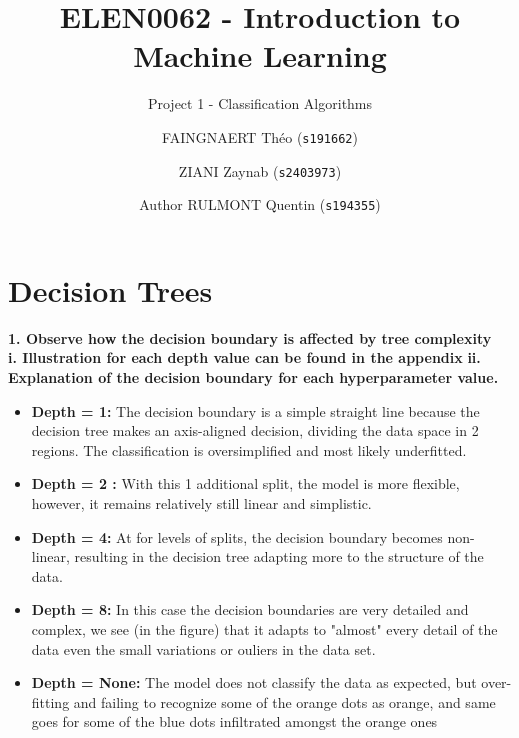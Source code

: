 \documentclass[acmconf,nonacm=true]{acmart}
\begin{document}
\title{ELEN0062 - Introduction to Machine Learning}
\subtitle{Project 1 - Classification Algorithms}

\author{FAINGNAERT Théo (\texttt{s191662})}
\author{ZIANI Zaynab (\texttt{s2403973})}
\author{Author RULMONT Quentin (\texttt{s194355})}

\maketitle

\section{Decision Trees}


\textbf{1. Observe how the decision boundary is affected by tree complexity}\\
\textbf{i. Illustration for each depth value can be found in the appendix}
\newline
    \textbf{ii. Explanation of the decision boundary for each hyperparameter value.}
    \begin{itemize}
        \item \textbf{Depth = 1: }The decision boundary is a simple straight line because the decision tree makes an axis-aligned decision, dividing the data space in 2 regions. The classification is oversimplified and most likely underfitted.
    \end{itemize}
    \begin{itemize}
        \item \textbf{Depth = 2 :}  With this 1 additional split, the model is more flexible, however, it remains relatively still linear and simplistic.
    \end{itemize}
   \begin{itemize}
       \item \textbf{ Depth = 4: }At for levels of splits, the decision boundary becomes non-linear, resulting in the decision tree adapting more to the structure of the data.
   \end{itemize}
   \begin{itemize}
       \item \textbf{Depth = 8: } In this case the decision boundaries are very detailed and complex, we see (in the figure) that it adapts to "almost" every detail of the data even the small variations or ouliers in the data set.
       \item \textbf{Depth = None: } The model does not classify the data as expected, but over-fitting and failing to recognize some of the orange dots as orange, and same goes for some of the blue dots infiltrated amongst the orange ones
    \end{itemize}
\end{document}
